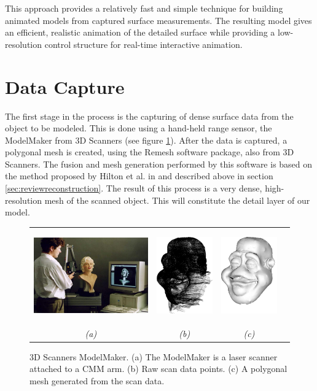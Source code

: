 \documentclass[10pt,oneside,fleqn,a4paper]{book}
\begin{document}
This approach provides a relatively fast and simple technique for building animated models from captured surface measurements. The resulting model gives an efficient, realistic animation of the detailed surface while providing a low-resolution control structure for real-time interactive animation.

\section{\label{sec:chaincapture}Data Capture}
The first stage in the process is the capturing of dense surface data from the object to be modeled. This is done using a hand-held range sensor, the ModelMaker from 3D Scanners (see figure \ref{fig:modelmaker}). After the data is captured, a polygonal mesh is created, using the Remesh software package, also from 3D Scanners. The fusion and mesh generation performed by this software is based on the method proposed by Hilton et al. in \cite{Hilton96b} and described above in section \ref{sec:reviewreconstruction}. The result of this process is a very dense, high-resolution mesh of the scanned object. This will constitute the detail layer of our model.

\begin{figure}
\begin{center}
\begin{tabular}{cccc}
\includegraphics[height=4cm]{../images/modelmaker} &
\includegraphics[height=4cm]{../images/scandata} &
\includegraphics[height=4cm]{../images/decimated_smoothshaded} \\
{\it(a)} & {\it(b)} & {\it(c)}
\end{tabular}
\caption[3D Scanners ModelMaker]{\label{fig:modelmaker} 3D Scanners ModelMaker. (a) The ModelMaker is a laser scanner attached to a CMM arm. (b) Raw scan data points. (c) A polygonal mesh generated from the scan data.}
\end{center}
\end{figure}
\end{document}
